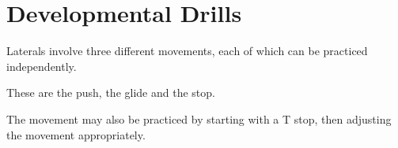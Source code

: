 \section{Developmental Drills}

Laterals involve three different movements, each of which can be practiced independently. 

These are the push, the glide and the stop.

The movement may also be practiced by starting with a T stop, then adjusting the movement appropriately. 
